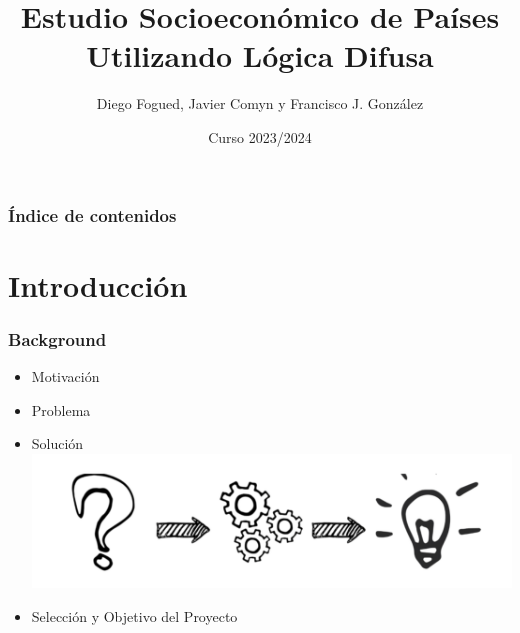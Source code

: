 \documentclass{beamer}
\title{Estudio Socioeconómico de Países\\ Utilizando Lógica Difusa}
\author{Diego Fogued, Javier Comyn y Francisco J. González}
\institute{Universidad Politécnica de Madrid}
\date{Curso 2023/2024}
\newcommand{\slideauthor}[1]{\gdef\insertslideauthor{#1}}
\begin{document}
\frame{\titlepage}

\begin{frame}
\frametitle{Índice de contenidos}
\tableofcontents
\end{frame}

\section{Introducción}
\begin{frame}
\frametitle{Background}
\slideauthor{Diego Fogued}
\begin{itemize}
    \item Motivación
    \vspace{0.45cm} 
    \item Problema
    \item Solución \hfill \includegraphics[width=0.3\linewidth]{Images/image-Photoroom.png}
    \vspace{0.45cm} 
    \item Selección y Objetivo del Proyecto
\end{itemize}

\end{frame}
\end{document}
